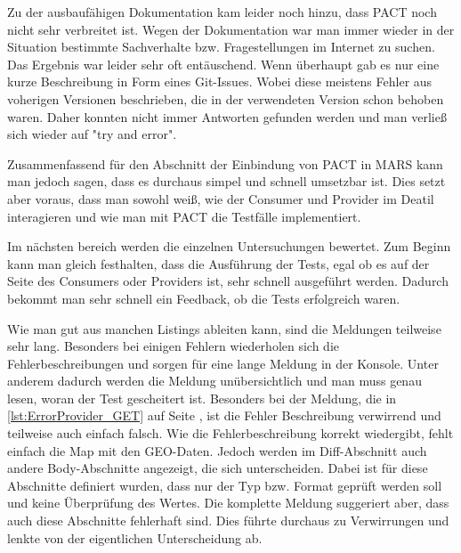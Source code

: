\documentclass{llncs}
\begin{document}
Zu der ausbaufähigen Dokumentation kam leider noch hinzu, dass PACT noch nicht sehr verbreitet ist. Wegen der Dokumentation war man immer wieder in der Situation bestimmte Sachverhalte bzw. Fragestellungen im Internet zu suchen. Das Ergebnis war leider sehr oft entäuschend. Wenn überhaupt gab es nur eine kurze Beschreibung in Form eines Git-Issues. Wobei diese meistens Fehler aus voherigen Versionen beschrieben, die in der verwendeten Version schon behoben waren. Daher konnten nicht immer Antworten gefunden werden und man verließ sich wieder auf "try and error".

Zusammenfassend für den Abschnitt der Einbindung von PACT in MARS kann man jedoch sagen, dass es durchaus simpel und schnell umsetzbar ist. Dies setzt aber voraus, dass man sowohl weiß, wie der Consumer und Provider im Deatil interagieren und wie man mit PACT die Testfälle implementiert.

Im nächsten bereich werden die einzelnen Untersuchungen bewertet. Zum Beginn kann man gleich festhalten, dass die Ausführung der Tests, egal ob es auf der Seite des Consumers oder Providers ist, sehr schnell ausgeführt werden. Dadurch bekommt man sehr schnell ein Feedback, ob die Tests erfolgreich waren. 

Wie man gut aus manchen Listings ableiten kann, sind die Meldungen teilweise sehr lang. Besonders bei einigen Fehlern wiederholen sich die Fehlerbeschreibungen und sorgen für eine lange Meldung in der Konsole. Unter anderem dadurch werden die Meldung unübersichtlich und man muss genau lesen, woran der Test gescheitert ist. Besonders bei der Meldung, die in \ref{lst:ErrorProvider_GET} auf Seite \pageref{lst:ErrorProvider_GET}, ist die Fehler Beschreibung verwirrend und teilweise auch einfach falsch. Wie die Fehlerbeschreibung korrekt wiedergibt, fehlt einfach die Map mit den GEO-Daten. Jedoch werden im Diff-Abschnitt auch andere Body-Abschnitte angezeigt, die sich unterscheiden. Dabei ist für diese Abschnitte definiert wurden, dass nur der Typ bzw. Format geprüft werden soll und keine Überprüfung des Wertes. Die komplette Meldung suggeriert aber, dass auch diese Abschnitte fehlerhaft sind. Dies führte durchaus zu Verwirrungen und lenkte von der eigentlichen Unterscheidung ab. 
 
\end{document}
